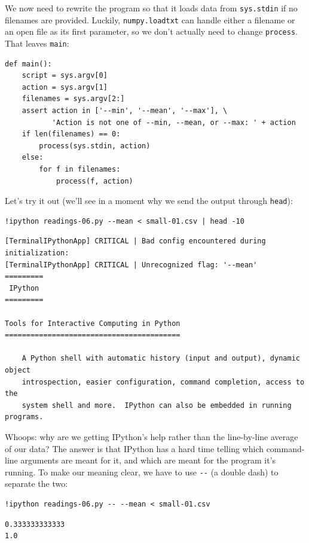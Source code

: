 \documentclass{book}
\begin{document}
We now need to rewrite the program so that it loads data from
\texttt{sys.stdin} if no filenames are provided. Luckily,
\texttt{numpy.loadtxt} can handle either a filename or an open file as
its first parameter, so we don't actually need to change
\texttt{process}. That leaves \texttt{main}:

\begin{verbatim}
def main():
    script = sys.argv[0]
    action = sys.argv[1]
    filenames = sys.argv[2:]
    assert action in ['--min', '--mean', '--max'], \
           'Action is not one of --min, --mean, or --max: ' + action
    if len(filenames) == 0:
        process(sys.stdin, action)
    else:
        for f in filenames:
            process(f, action)
\end{verbatim}

Let's try it out (we'll see in a moment why we send the output through
\texttt{head}):

\begin{verbatim}
!ipython readings-06.py --mean < small-01.csv | head -10
\end{verbatim}

\begin{verbatim}
[TerminalIPythonApp] CRITICAL | Bad config encountered during initialization:
[TerminalIPythonApp] CRITICAL | Unrecognized flag: '--mean'
=========
 IPython
=========

Tools for Interactive Computing in Python
=========================================

    A Python shell with automatic history (input and output), dynamic object
    introspection, easier configuration, command completion, access to the
    system shell and more.  IPython can also be embedded in running programs.
\end{verbatim}

Whoops: why are we getting IPython's help rather than the line-by-line
average of our data? The answer is that IPython has a hard time telling
which command-line arguments are meant for it, and which are meant for
the program it's running. To make our meaning clear, we have to use
\texttt{-{}-} (a double dash) to separate the two:

\begin{verbatim}
!ipython readings-06.py -- --mean < small-01.csv
\end{verbatim}

\begin{verbatim}
0.333333333333
1.0
\end{verbatim}
\end{document}
